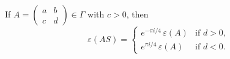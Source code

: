 If $A = \begin{pmatrix} a & b \\ c & d \end{pmatrix} \in \Gamma$ with $c > 0$, then
$$
\varepsilon(AS) = \begin{cases}
e^{-\pi i/4} \, \varepsilon(A) & \text{if } d > 0, \\
e^{\pi i/4} \, \varepsilon(A) & \text{if } d < 0.
\end{cases}
$$
